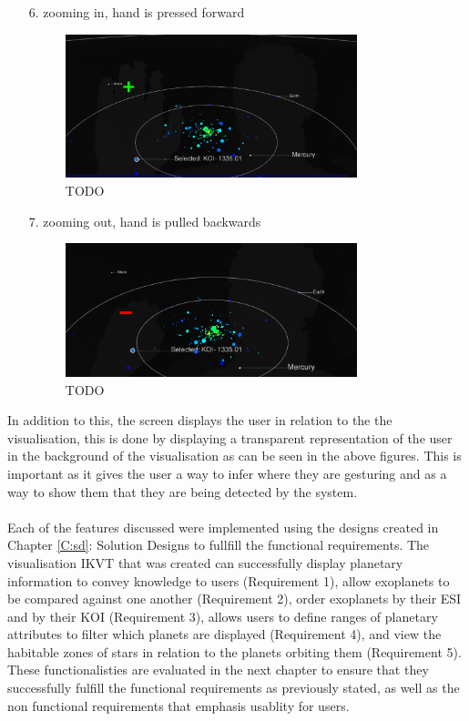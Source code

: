 \begin{enumerate}
 \item[6.] zooming in, hand is pressed forward
 \begin{figure}[H]
  \centering
      \includegraphics[width=0.8\textwidth]{images/in.PNG}
  \caption{TODO}
  \label{fig:in}
\end{figure}

 \item[7.] zooming out, hand is pulled backwards
 
\begin{figure}[H]
  \centering
      \includegraphics[width=0.8\textwidth]{images/out.PNG}
  \caption{TODO}
  \label{fig:out}
\end{figure}

\end{enumerate}

In addition to this, the screen displays the user in relation to the
the visualisation, this is done by displaying a transparent representation of
the user in the background of the visualisation as can be seen in the above
figures. This is important as it gives the user a way to infer where they are
gesturing and as a way to show them that they are being detected by the system.
\\\\
Each of the features discussed were implemented using the designs created in
Chapter \ref{C:sd}: Solution Designs to fullfill the functional requirements.
The visualisation IKVT that was created can successfully display planetary
information to convey knowledge to users (Requirement 1), allow exoplanets to be
compared against one another (Requirement 2), order exoplanets by their ESI and
by their KOI (Requirement 3), allows users to define ranges of planetary
attributes to filter which planets are displayed (Requirement 4), and view the
habitable zones of stars in
relation to the planets orbiting them (Requirement 5). These functionalisties
are evaluated in the next chapter to ensure that they successfully fulfill the
functional requirements as previously stated, as well as the non functional
requirements that emphasis usablity for users.




